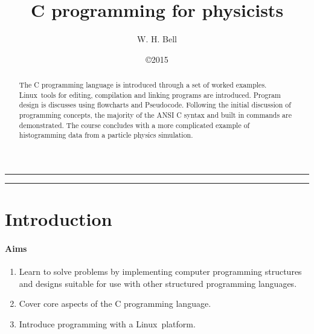 \documentclass[11pt]{scrartcl}
\def\psc{Pseudocode}
\def\linux{Linux}
\begin{document}
\title{C programming for physicists}
\author{W. H. Bell}
\date{
\copyright 2015
}

\maketitle
\hrule
\vspace{0.2cm}
\begin{abstract}
The C programming language is introduced through a set of worked examples.  \linux\ tools for editing, compilation and linking programs are introduced.  Program design is discusses using flowcharts and \psc.  Following the initial discussion of programming concepts, the majority of the ANSI C syntax and built in commands are demonstrated.  The course concludes with a more complicated example of histogramming data from a particle physics simulation.
\end{abstract}
\vspace{0.2cm}
\hrule

\clearpage
\newpage

\tableofcontents

\clearpage
\newpage

\pagestyle{fancy}

\section{Introduction}
\paragraph{Aims}
\begin{enumerate}
\item Learn to solve problems by implementing computer programming structures and designs suitable for use with other structured programming languages.
\item Cover core aspects of the C programming language.
\item Introduce programming with a \linux\ platform. 
\end{enumerate}
\end{document}
